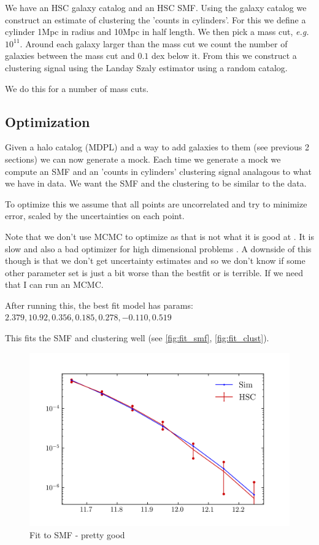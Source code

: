 \documentclass{article}
\newcommand{\eg}{{\it e.g.\/}}
\begin{document}
We have an HSC galaxy catalog and an HSC SMF. Using the galaxy catalog we construct an estimate of clustering the 'counts in cylinders'.
For this we define a cylinder 1Mpc in radius and 10Mpc in half length. We then pick a mass cut, \eg{} $10^{11}$.
Around each galaxy larger than the mass cut we count the number of galaxies between the mass cut and $0.1$ dex below it.
From this we construct a clustering signal using the Landay Szaly estimator using a random catalog.

We do this for a number of mass cuts.


\subsection{Optimization}
Given a halo catalog (MDPL) and a way to add galaxies to them (see previous 2 sections) we can now generate a mock. Each time we generate a mock we compute an SMF and an 'counts in cylinders' clustering signal analagous to what we have in data. We want the SMF and the clustering to be similar to the data.

To optimize this we assume that all points are uncorrelated and try to minimize error, scaled by the uncertainties on each point.

Note that we don't use MCMC to optimize as that is not what it is good at \cite{Hogg2018}. It is slow and also a bad optimizer for high dimensional problems \cite{Betancourt2017}. A downside of this though is that we don't get uncertainty estimates and so we don't know if some other parameter set is just a bit worse than the bestfit or is terrible. If we need that I can run an MCMC.

After running this, the best fit model has params: \\$2.379, 10.92,  0.356,  0.185,  0.278, -0.110, 0.519$

This fits the SMF and clustering well (see \autoref{fig:fit_smf}, \autoref{fig:fit_clust}).

\begin{figure}[h]
    \includegraphics[width=\textwidth]{images/fit_smf.png}
    \caption{Fit to SMF - pretty good
        \label{fig:fit_smf}
    }
\end{figure}
\end{document}
